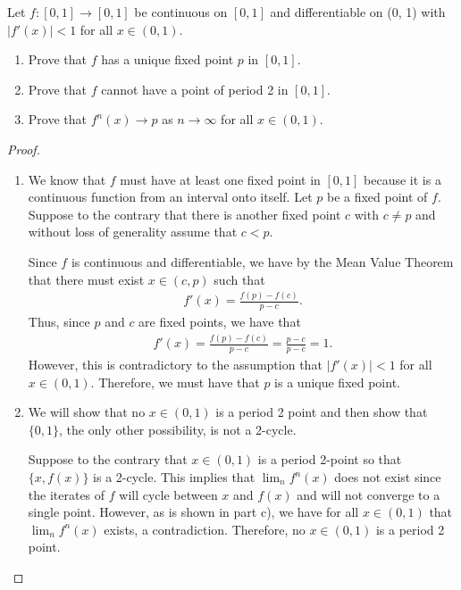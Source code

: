 \begin{problem}{5}
  Let $f:[0,1] \to [0,1]$ be continuous on $[0,1]$ and differentiable on (0, 1)
  with $|f'(x)| < 1$ for all $x\in (0, 1)$.

  \begin{enumerate}
    \item Prove that $f$ has a unique fixed point $p$ in $[0,1]$.
    \item Prove that $f$ cannot have a point of period 2 in $[0,1]$.
    \item Prove that $f^n(x) \to p$ as $n\to\infty$ for all $x\in(0,1)$.
  \end{enumerate}
\end{problem}

\begin{proof}
  \begin{enumerate}
    \item We know that $f$ must have at least one fixed point in $[0, 1]$ because it is a
      continuous function from an interval onto itself. Let $p$ be a fixed point of $f$.
      Suppose to the contrary that there is another fixed point $c$ with $c \neq p$
      and without loss of generality assume that $c < p$.

      Since $f$ is continuous and differentiable, we have by the Mean Value Theorem
      that there must exist $x \in (c, p)$ such that
      \begin{align*}
        f'(x) = \frac{f(p) - f(c)}{p - c}.
      \end{align*}
      Thus, since $p$ and $c$ are fixed points, we have that
      \begin{align*}
        f'(x) = \frac{f(p) - f(c)}{p - c} = \frac{p - c}{p - c} = 1.
      \end{align*}
      However, this is contradictory to the assumption that $|f'(x)| < 1$ for all $x\in (0,1)$.
      Therefore, we must have that $p$ is a unique fixed point.
    \item We will show that no $x \in (0,1)$ is a period 2 point and then show that $\{0,1\}$, the only other possibility,
      is not a 2-cycle.

      Suppose to the contrary that $x\in(0,1)$ is a period 2-point so that $\{x, f(x)\}$ is a 2-cycle.
      This implies that $\lim_n f^n(x)$ does not exist since the iterates of $f$ will cycle between
      $x$ and $f(x)$ and will not converge to a single point. However,
      as is shown in part c), we have for all $x \in (0, 1)$ that $\lim_n f^n(x)$ exists, a contradiction. Therefore,
      no $x\in(0,1)$ is a period 2 point.


\end{enumerate}
\end{proof}
